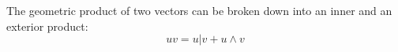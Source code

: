 \begin{theorem}\label{t:geometric-product}
	The geometric product of two vectors can be broken down into an inner and an exterior product: \[uv = u | v + u \wedge v\]
\end{theorem}
